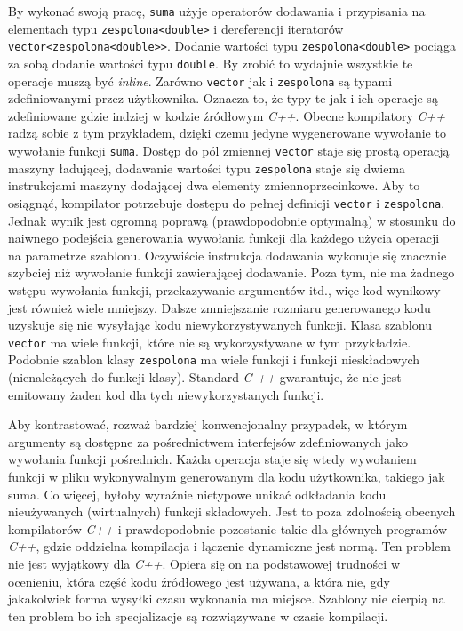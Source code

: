 \documentclass[11pt, a4paper]{article}
\begin{document}
By wykonać swoją pracę, \verb#suma# użyje operatorów dodawania i przypisania na elementach typu \verb#zespolona<double># i dereferencji iteratorów \verb#vector<zespolona<double>>#.  Dodanie wartości typu \verb#zespolona<double># pociąga za sobą dodanie wartości typu \verb#double#. By zrobić to wydajnie wszystkie te operacje muszą być \emph{inline}.  Zarówno \verb#vector# jak i \verb#zespolona# są typami zdefiniowanymi przez użytkownika. Oznacza to, że typy te jak i ich operacje są zdefiniowane gdzie indziej w kodzie źródłowym \emph{C++}. Obecne kompilatory \emph{C++} radzą sobie z tym przykładem, dzięki czemu jedyne wygenerowane wywołanie to wywołanie funkcji \verb#suma#. Dostęp do pól zmiennej \verb#vector# staje się prostą operacją maszyny ładującej, dodawanie wartości typu \verb#zespolona# staje się dwiema instrukcjami maszyny dodającej dwa elementy zmiennoprzecinkowe. Aby to osiągnąć, kompilator potrzebuje dostępu do pełnej definicji \verb#vector# i \verb#zespolona#. Jednak wynik jest ogromną poprawą (prawdopodobnie optymalną) w stosunku do naiwnego podejścia generowania wywołania funkcji dla każdego użycia operacji na parametrze szablonu. Oczywiście instrukcja dodawania wykonuje się znacznie szybciej niż wywołanie funkcji zawierającej dodawanie. Poza tym, nie ma żadnego wstępu wywołania funkcji, przekazywanie argumentów itd., więc kod wynikowy jest również wiele mniejszy. Dalsze zmniejszanie rozmiaru generowanego kodu uzyskuje się nie wysyłając kodu niewykorzystywanych funkcji. Klasa szablonu \verb#vector# ma wiele funkcji, które nie są wykorzystywane w tym przykładzie. Podobnie szablon klasy \verb#zespolona# ma wiele funkcji i funkcji nieskładowych (nienależących do funkcji klasy). Standard \emph{C ++} gwarantuje, że nie jest emitowany żaden kod dla tych niewykorzystanych funkcji. 

Aby kontrastować, rozważ bardziej konwencjonalny przypadek, w którym argumenty są dostępne za pośrednictwem interfejsów zdefiniowanych jako wywołania funkcji pośrednich. Każda operacja staje się wtedy wywołaniem funkcji w pliku wykonywalnym generowanym dla kodu użytkownika, takiego jak suma. Co więcej, byłoby wyraźnie nietypowe unikać odkładania kodu nieużywanych (wirtualnych) funkcji składowych. Jest to poza zdolnością obecnych kompilatorów \emph{C++} i prawdopodobnie pozostanie takie dla głównych programów \emph{C++}, gdzie oddzielna kompilacja i łączenie dynamiczne jest normą. Ten problem nie jest wyjątkowy dla \emph{C++}. Opiera się on na podstawowej trudności w ocenieniu, która część kodu źródłowego jest używana, a która nie, gdy jakakolwiek forma wysyłki czasu wykonania ma miejsce. Szablony nie cierpią na ten problem bo ich specjalizacje są rozwiązywane w czasie kompilacji.
\end{document}
